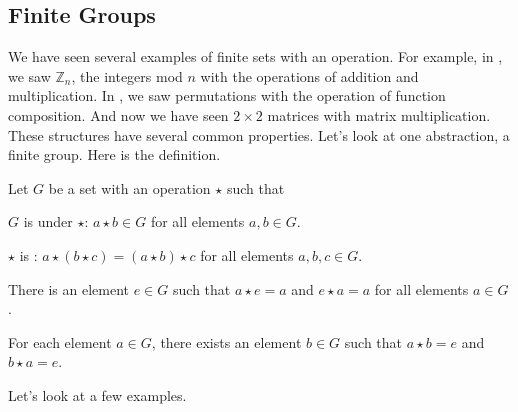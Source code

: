 \newcommand{\subgroups}{Finite Groups}
\subsection{\subgroups}
\label{sub_finite_groups}

We have seen several examples of finite sets with an operation.  For example, in , we saw $\mathbb{Z}_n$, the integers mod $n$ with the operations of addition and multiplication.  In , we saw permutations with the operation of function composition.  And now we have seen $2 \times 2$ matrices with matrix multiplication.  These structures have several common properties.  Let's look at one abstraction, a finite group.  Here is the definition.

\begin{defn}[Group]
\label{defn_group}
    Let $G$ be a set with an operation $\star$ such that
        \begin{apart}
            \item $G$ is  under $\star$:  $a \star b \in G$ for all elements $a, b \in G$.
            \item $\star$ is :  $a \star (b \star c) = (a \star b) \star c$ for all elements $a, b,c \in G$. 
            \item There is an  element $e \in G$ such that $a \star e = a$ and $e \star a = a$ for all elements $a \in G$. 
            \item For each element $a \in G$, there exists an  element $b \in G$ such that $a \star b = e$ and $b \star a = e$.  
        \end{apart}
\end{defn}

Let's look at a few examples.

